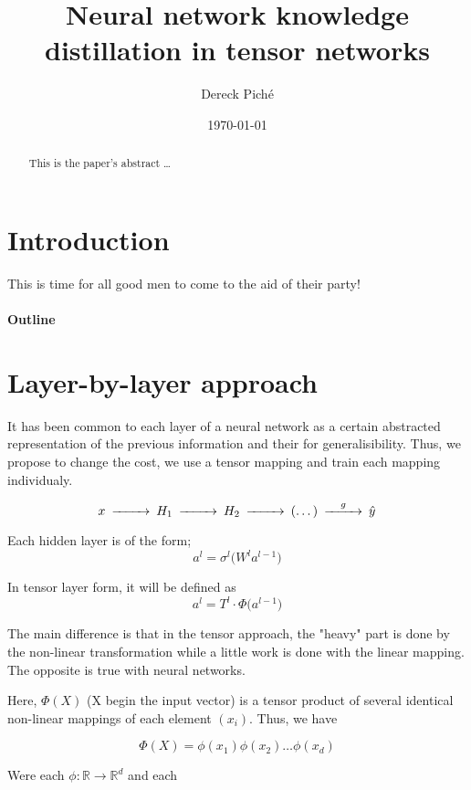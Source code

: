 \documentclass[11pt]{article}
\title{Neural network knowledge distillation in tensor networks}
\author{Dereck Piché}
\date{\today}
\begin{document}
\maketitle

\begin{abstract}
This is the paper's abstract \ldots
\end{abstract}

\section{Introduction}
This is time for all good men to come to the aid of their party!

\paragraph{Outline}


\section{Layer-by-layer approach}
It has been common to each layer of a neural network as a certain abstracted representation of the previous information and their for generalisibility. Thus, we propose to change the cost, we use a tensor mapping and train each mapping individualy.

\begin{equation*}
\begin{CD}
    x @>>>H_1 @>>>H_2 @>>>(\dots)@>g>> \hat{y}
\end{CD}
\end{equation*}

Each hidden layer is of the form;
\begin{equation*}
    a^l = \sigma^l \bigl( W^l a^{l-1} \bigr)
\end{equation*}

In tensor layer form, it will be defined as 
\begin{equation*}
    a^l = T^l \cdot \Phi \bigl( a^{l-1} \bigr)
\end{equation*}

The main difference is that in the tensor approach, the "heavy" part is done by the non-linear transformation while a little work is done with the linear mapping. The opposite is true with neural networks.

Here, $\Phi(X)$ (X begin the input vector) is a tensor product of several identical non-linear mappings of each element $(x_i)$. Thus, we have 

\begin{equation*}
    \Phi(X) = \phi(x_1)\phi(x_2)\dots\phi(x_d)
\end{equation*}

Were each $\phi : \mathbb{R} \rightarrow \mathbb{R}^d$
and each 





\end{document}

